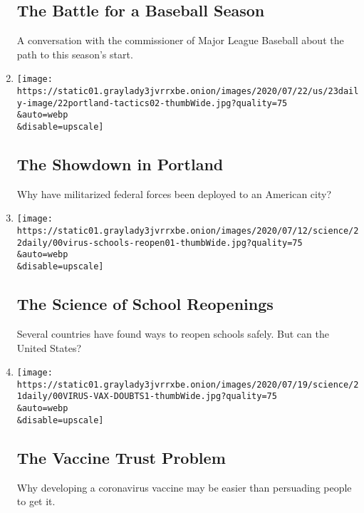 \begin{enumerate}
  \hypertarget{the-battle-for-a-baseball-season}{%
  \subsection{The Battle for a Baseball
  Season}\label{the-battle-for-a-baseball-season}}

  A conversation with the commissioner of Major League Baseball about
  the path to this season's start.
\item
  \href{/2020/07/23/podcasts/the-daily/portland-protests.html}{}

  \texttt{[image: https://static01.graylady3jvrrxbe.onion/images/2020/07/22/us/23daily-image/22portland-tactics02-thumbWide.jpg?quality=75\\\&auto=webp\\\&disable=upscale]}

  \hypertarget{the-showdown-in-portland}{%
  \subsection{The Showdown in Portland}\label{the-showdown-in-portland}}

  Why have militarized federal forces been deployed to an American city?
\item
  \href{/2020/07/22/podcasts/the-daily/school-reopenings-coronavirus.html}{}

  \texttt{[image: https://static01.graylady3jvrrxbe.onion/images/2020/07/12/science/22daily/00virus-schools-reopen01-thumbWide.jpg?quality=75\\\&auto=webp\\\&disable=upscale]}

  \hypertarget{the-science-of-school-reopenings}{%
  \subsection{The Science of School
  Reopenings}\label{the-science-of-school-reopenings}}

  Several countries have found ways to reopen schools safely. But can
  the United States?
\item
  \href{/2020/07/21/podcasts/the-daily/coronavirus-vaccine.html}{}

  \texttt{[image: https://static01.graylady3jvrrxbe.onion/images/2020/07/19/science/21daily/00VIRUS-VAX-DOUBTS1-thumbWide.jpg?quality=75\\\&auto=webp\\\&disable=upscale]}

  \hypertarget{the-vaccine-trust-problem}{%
  \subsection{The Vaccine Trust
  Problem}\label{the-vaccine-trust-problem}}

  Why developing a coronavirus vaccine may be easier than persuading
  people to get it.
\end{enumerate}


